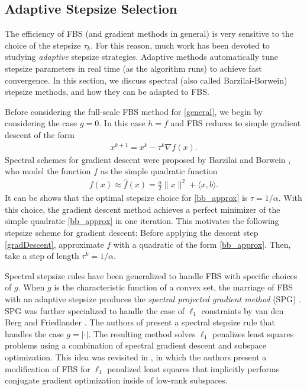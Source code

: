 \documentclass{amsart}
\newcommand{\aln}[1]{\begin{align}#1\end{align}}
\newcommand{\ra}{\rangle}
\newcommand{\la}{\langle}
\newcommand{\kp}{^{k+1}}
\theoremstyle{definition}
\begin{document}
\subsection{Adaptive Stepsize Selection} \label{sec:adapt}
The efficiency of FBS (and gradient methods in general) is very sensitive to the choice of the stepsize $\tau_k.$  For this reason, much work has been devoted to studying {\em adaptive} stepsize strategies. Adaptive methods automatically tune stepsize parameters in real time (as the algorithm runs) to achieve fast convergence.  In this section, we discuss spectral (also called Barzilai-Borwein) stepsize methods, and how they can be adapted to FBS. 


Before considering the full-scale FBS method for \eqref{general}, we begin by considering the case $g=0.$  In this case $h=f$ and FBS reduces to simple gradient descent of the form
 \aln{x\kp = x^k-\tau^k \nabla f(x). \label{gradDescent}} 
     Spectral schemes for gradient descent were proposed by Barzilai and Borwein \cite{BB88}, who model the function $f$ as the simple quadratic function 
 \aln{ \label {bb_approx} f(x)   \approx   \hat f(x) =  \frac{a}{2} \|x\|^2+\la x , b \ra.}
 It can be shows that the optimal stepsize choice for \eqref{bb_approx} is $\tau = 1/\alpha.$  With this choice, the gradient descent method achieves a perfect minimizer of the simple quadratic \eqref{bb_approx} in one iteration.  This motivates the following stepsize scheme for gradient descent:  Before applying the descent step \eqref{gradDescent}, approximate $f$ with a quadratic of the form \eqref{bb_approx}.  Then, take a step of length $\tau^k=1/\alpha.$


Spectral stepsize rules have been generalized to handle FBS with specific choices of $g.$   When $g$ is the characteristic function of a convex set, the marriage of FBS with an adaptive stepsize produces the {\em spectral projected gradient method} (SPG) \cite{BMR00}.  SPG was further specialized to handle the case of $\ell_1$ constraints by  van den Berg and Friedlander \cite{VF07,VF08}.  The authors of \cite{WYG10} present a spectral stepsize rule that handles the case $g=|\cdot|$.  The resulting method solves $\ell_1$ penalizes least squares problems using a combination of spectral gradient descent and subspace optimization.  This idea was revisited in \cite{GS10}, in which the authors present a modification of FBS for $\ell_1$ penalized least squares that implicitly performs conjugate gradient optimization inside of low-rank subspaces. 
\end{document}

